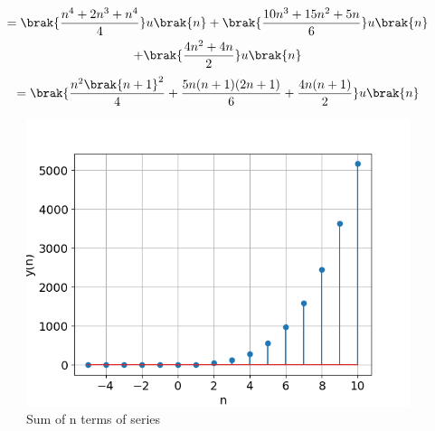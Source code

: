 \documentclass[journal,12pt,twocolumn]{IEEEtran}
\theoremstyle{remark}
\begin{document}
    \begin{multline}
        = \brak{\frac{n^4+2n^3+n^4}{4}}u\brak{n} +\brak{\frac{10n^3+15n^2+5n}{6}}u\brak{n}\\
        +\brak{\frac{4n^2+4n}{2}}u\brak{n}
    \end{multline}
    \begin{multline}
        = \brak{\frac{n^2\brak{n+1}^2}{4} + \frac{5n(n+1)(2n+1)}{6} 
        + \frac{4n(n+1)}{2}} u\brak{n}
    \end{multline}
    \begin{figure}[!h] 
    \centering
    \includegraphics[width=\columnwidth]{ncert-maths/11/9/4/8/figs/sumplot.png}
    \caption{Sum of n terms of series}
    \label{fig:Graph1_math.11.9.4.8}
    \end{figure}
\end{document}
